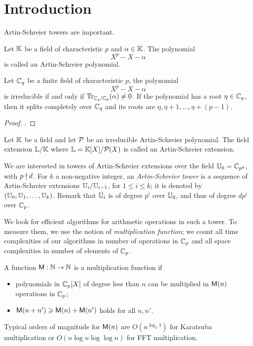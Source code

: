 \section{Introduction}
\label{sec:introduction}
Artin-Schreier towers are important.

\begin{definition}
  \label{def:aspolynomial}
  Let $\mathbb{K}$ be a field of characteristic $p$ and $\alpha\in\mathbb{K}$. The polynomial
  \[X^p - X - \alpha\]
  is called an Artin-Schreier polynomial.
\end{definition}

\begin{proposition}
  \label{th:asfundamental}
  Let $\mathbb{C}_q$ be a finite field of characteristic $p$, the polynomial
  \[X^p - X - \alpha\]
  is irreducible if and only if $\operatorname{Tr}_{\mathbb{C}_q/\mathbb{C}_p}(\alpha) \ne 0$. If
  the polynomial has a root $\eta\in\mathbb{C}_q$, then it splits completely
  over $\mathbb{C}_q$ and its roots are $\eta, \eta + 1, \ldots, \eta +
  (p-1)$.
\end{proposition}
\begin{proof}
  \cite[Theorem 2.25]{LN}.
\end{proof}

\begin{definition}
  \label{def:asextension}
  Let $\mathbb{K}$ be a field and let $\mathcal{P}$ be an irreducible
  Artin-Schreier polynomial. The field extension $\mathbb{L}/\mathbb{K}$ where $\mathbb{L} =
  \mathbb{K}[X]/\mathcal{P}(X)$ is called an Artin-Schreier extension.
\end{definition}

We are interested in towers of Artin-Schreier extensions over the
field $\mathbb{U}_0=\mathbb{C}_{p^d}$, with $p\nmid d$. For $k$ a non-negative
integer, an {\em Artin-Schreier tower} is a sequence of Artin-Schreier
extensions $\mathbb{U}_i / \mathbb{U}_{i-1}$, for $1\le i \le k$; it is denoted by
$(\mathbb{U}_0, \mathbb{U}_1, \ldots, \mathbb{U}_k)$. Remark that $\mathbb{U}_i$ is of degree $p^i$
over $\mathbb{U}_0$, and thus of degree $dp^i$ over $\mathbb{C}_p$.

We look for efficient algorithms for arithmetic operations in such a
tower. To measure them, we use the notion of {\em multiplication
  function}; we count all time complexities of our algorithms in
number of operations in $\mathbb{C}_p$ and all space complexities in number of
elements of $\mathbb{C}_p$.

\begin{definition}
  \label{def:mult}
  A function $\mathrm{\sf M} : \mathbb{N} \rightarrow \mathbb{N}$ is a multiplication function
  if
  \begin{itemize}
  \item polynomials in $\mathbb{C}_p[X]$ of degree less than $n$ can be
    multiplied in $\mathrm{\sf M}(n)$ operations in $\mathbb{C}_p$;
  \item $\mathrm{\sf M}(n + n') \geqslant \mathrm{\sf M}(n) + \mathrm{\sf M}(n')$ holds for all $n,n'$.
  \end{itemize}
\end{definition}
Typical orders of magnitude for $\mathrm{\sf M}(n)$ are $O(n^{\log_2 3})$ for
Karatsuba multiplication or $O(n\log n \log\log n)$ for FFT
multiplication.

